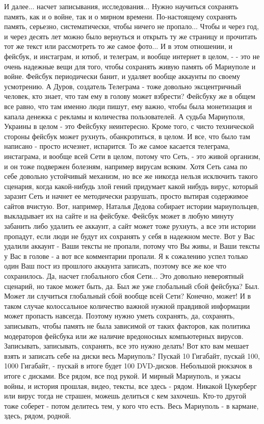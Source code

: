 И далее... насчет записывания, исследования... Нужно научиться сохранять
память, как и о войне, так и о мирном времени. По-настоящему сохранять память,
серьезно, систематически, чтобы ничего не пропало...  Чтобы и через год, и
через десять лет можно было вернуться и открыть ту же страницу и прочитать тот
же текст или рассмотреть то же самое фото...  И в этом отношении, и фейсбук, и
инстаграм, и ютюб, и телеграм, и вообще интернет в целом, - - это не очень
надежные вещи для того, чтобы сохранять живую память об Мариуполе и войне.
Фейсбук периодически банит, и удаляет вообще аккаунты по своему усмотрению. А
Дуров, создатель Телеграма - тоже довольно эксцентричный человек, кто знает,
что там ему в голову может взбрести? Фейсбуку же в общем все равно, что там
именно люди пишут, ему важно, чтобы была монетизация и капала денежка с рекламы
и количества пользователей. А судьба Мариуполя, Украины в целом - это Фейсбуку
неинтересно.  Кроме того, с чисто технической стороны фейсбук может рухнуть,
обанкротиться, в целом. И все, что было там написано - просто исчезнет,
испарится.  То же самое касается телеграма, инстаграма, и вообще всей Сети в
целом, потому что Сеть, - это живой организм, и он тоже подвержен болезням,
например вирусам всяким. Хотя Сеть сама по себе довольно устойчивый механизм,
но все же никогда нельзя исключить такого сценария, когда какой-нибудь злой
гений придумает какой нибудь вирус, который заразит Сеть и начнет ее
методически разрушать, просто вытирая содержимое сайтов вчистую. Вот, например,
Наталья Дедова собирает истории мариупольцев, выкладывает их на сайте и на
фейсбуке. Фейсбук может в любую минуту забанить либо удалить ее аккаунт, а сайт
может тоже рухнуть, а все эти истории пропадут, если люди не будут их сохранять
у себя в надежном месте. Вот у Вас удалили аккаунт - Ваши тексты не пропали,
потому что Вы живы, и Ваши тексты у Вас в голове - а вот все комментарии
пропали. Я к сожалению успел только один Ваш пост из прошлого аккаунта
записать, поэтому все же кое что сохранилось.  Да, насчет глобального сбоя
Сети... Это довольно невероятный сценарий, но такое может быть, да. Был же уже
глобальный сбой фейсбука? Был. Может ли случиться глобальный сбой вообще всей
Сети? Конечно, может!  И в таком случае колоссальное количество важной нужной
правдивой информации может пропасть навсегда. Поэтому нужно уметь сохранять,
да, сохранять, записывать, чтобы память не была зависимой от таких факторов,
как политика модераторов фейсбука или же наличие вредоносных компьютерных
вирусов.  Записывать, записывать, сохранять, все это нужно делать!  Вот кто вам
мешает взять и записать себе на диски весь Мариуполь? Пускай 10 Гигабайт,
пускай 100, 1000 Гигабайт, - пускай в итоге будет 100 DVD-дисков.  Небольшой
рюкзачок в итоге с дисками.  Все рядом, все под рукой. И мирный Мариуполь, и
ужасы войны, и история прошлая, видео, тексты, все здесь - рядом.  Никакой
Цукерберг или вирус тогда не страшен, можешь делиться с кем захочешь.  Кто-то
другой тоже соберет - потом делитесь тем, у кого что есть. Весь Мариуполь - в кармане,
здесь, рядом, родной.

